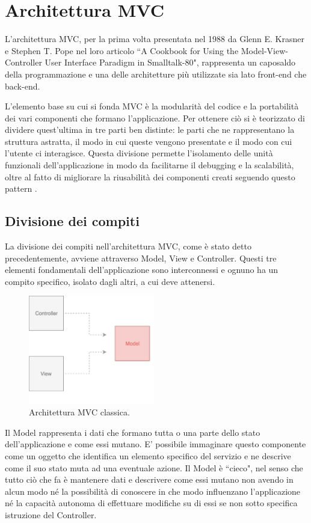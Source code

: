 \chapter{Architettura MVC}
L'architettura MVC, per la prima volta presentata nel 1988 da Glenn E. Krasner e Stephen T. Pope nel loro articolo “A Cookbook for Using the Model-View-Controller User Interface Paradigm in Smalltalk-80", rappresenta un caposaldo della programmazione e una delle architetture più utilizzate sia lato front-end che back-end.

L'elemento base su cui si fonda MVC è la modularità del codice e la portabilità dei vari componenti che formano l'applicazione. Per ottenere ciò si è teorizzato di dividere quest'ultima in tre parti ben distinte: le parti che ne rappresentano la struttura astratta, il modo in cui queste vengono presentate e il modo con cui l'utente ci interagisce. Questa divisione permette l'isolamento delle unità funzionali dell'applicazione in modo da facilitarne il debugging e la scalabilità, oltre al fatto di migliorare la riusabilità dei componenti creati seguendo questo pattern \cite{KrasnerAndPopeOnMVC}.

\section{Divisione dei compiti}
La divisione dei compiti nell'architettura MVC, come è stato detto precedentemente, avviene attraverso Model, View e Controller. Questi tre elementi fondamentali dell'applicazione sono interconnessi e ognuno ha un compito specifico, isolato dagli altri, a cui deve attenersi.

\begin{figure}
\centering 
\includegraphics[width=5.5cm]{./images/MVCdefault}
\caption{Architettura MVC classica.}
\end{figure}

Il Model rappresenta i dati che formano tutta o una parte dello stato dell'applicazione e come essi mutano. E' possibile immaginare questo componente come un oggetto che identifica un elemento specifico del servizio e ne descrive come il suo stato muta ad una eventuale azione. Il Model è “cieco", nel senso che tutto ciò che fa è mantenere dati e descrivere come essi mutano non avendo in alcun modo né la possibilità di conoscere in che modo influenzano l'applicazione né la capacità autonoma di effettuare modifiche su di essi se non sotto specifica istruzione del Controller.

